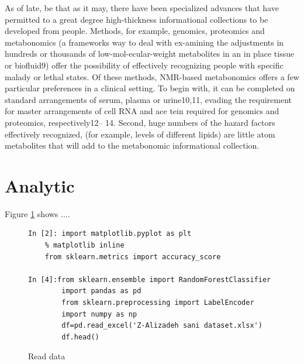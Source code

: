 \documentclass[sigconf]{acmart}
\begin{document}
As of late, be that as it may, there have been specialized advances that have permitted to a great degree high-thickness informational collections to be developed from people. Methods, for example, genomics, proteomics and metabonomics (a frameworks way to deal with ex-amining the adjustments in hundreds or thousands of low-mol-ecular-weight metabolites in an in place tissue or biofluid9) offer the possibility of effectively recognizing people with specific malady or lethal states. Of these methods, NMR-based metabonomics offers a few particular preferences in a clinical setting. To begin with, it can be completed on standard arrangements of serum, plasma or urine10,11, evading the requirement for master arrangements of cell RNA and ace tein required for genomics and proteomics, respectively12– 14. Second, huge numbers of the hazard factors effectively recognized, (for example, levels of different lipids) are little atom metabolites that will add to the metabonomic informational collection.

\section{Analytic}

Figure \ref{F:readdata} shows ....

\begin{figure}[htb]

\begin{lstlisting}
In [2]: import matplotlib.pyplot as plt
    % matplotlib inline
    from sklearn.metrics import accuracy_score

In [4]:from sklearn.ensemble import RandomForestClassifier
        import pandas as pd
        from sklearn.preprocessing import LabelEncoder
        import numpy as np
        df=pd.read_excel('Z-Alizadeh sani dataset.xlsx')
        df.head()
\end{lstlisting}
\caption{Read data}\label{F:readdata}
\end{figure}

\end{document}
